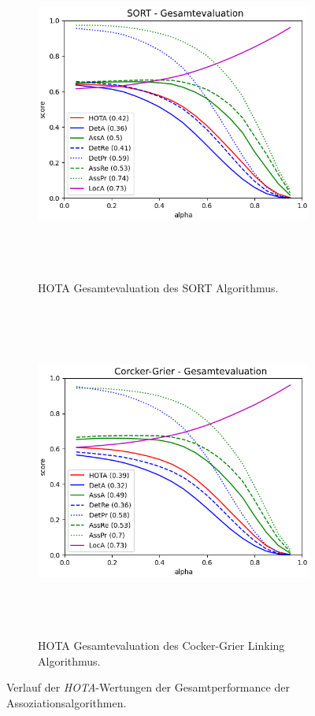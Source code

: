 \begin{figure}[htbp]
     \centering
     \begin{subfigure}[b]{0.9\textwidth}
         \centering
         \includegraphics[width=\textwidth, height=11cm]{img/Plots/MOT Evaluation/HOTA SORT Gesamt.png}
         \caption{HOTA Gesamtevaluation des SORT Algorithmus.}
     \end{subfigure}
     \hfill
     \begin{subfigure}[b]{0.9\textwidth}
         \centering
         \includegraphics[width=\textwidth, height=11cm]{img/Plots/MOT Evaluation/HOTA CrockGrier Gesamt.png}
         \caption{HOTA Gesamtevaluation des Cocker-Grier Linking Algorithmus.}
     \end{subfigure}
     \caption{Verlauf der \textit{HOTA}-Wertungen der Gesamtperformance der Assoziationsalgorithmen.}
     \label{fig:ErgebGesamtMOT}
\end{figure}


